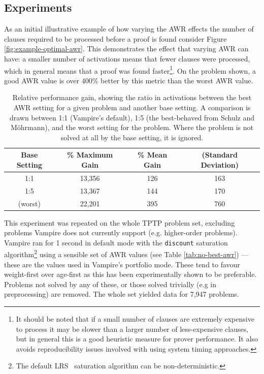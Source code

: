 \documentclass{llncs}
\newcommand{\sandm}{Schulz and M{\"{o}}hrmann}
\begin{document}
\subsection{Experiments}
As an initial illustrative example of how varying the AWR effects the number of clauses required to be processed before a proof is found consider Figure \ref{fig:example-optimal-awr}. This demonstrates the effect that varying AWR can have: a smaller number of activations means that fewer clauses were processed, which in general means that a proof was found faster\footnote{
It should be noted that if a small number of clauses are extremely expensive to process it may be slower than a larger number of less-expensive clauses, but in general this is a good heuristic measure for prover performance.
It also avoids reproducibility issues involved with using system timing approaches.
}.
On the problem shown, a good AWR value is over 400\% better by this metric than the worst AWR value.

\begin{table}[t]
	\caption{
Relative performance gain, showing the ratio in activations between the best AWR setting for a given problem and another base setting.
A comparison is drawn between 1:1 (Vampire's default), 1:5 (the best-behaved from \sandm), and the worst setting for the problem.
Where the problem is not solved at all by the base setting, it is ignored.
}
	\centering
	\begin{tabular}{c | c | c c}
		Base Setting & \% Maximum Gain & \% Mean Gain & (Standard Deviation)\\
		\hline
		1:1 & 13,356 & 126 & 163 \\
		1:5 & 13,367 & 144 & 170 \\
		(worst) & 22,201 & 395 & 760
	\end{tabular}
	\label{tab:awr-improvement}
\end{table}

This experiment was repeated on the whole TPTP problem set, excluding problems Vampire does not currently support (e.g. higher-order problems).
Vampire ran for 1 second in default mode with the \texttt{discount} saturation algorithm\footnote{The default LRS~\cite{LRS} saturation algorithm can be non-deterministic.} using a sensible set of AWR values (see Table \ref{tab:no-best-awr}) --- these are the values used in Vampire's portfolio mode.
These tend to favour weight-first over age-first as this has been experimentally shown to be preferable.
Problems not solved by any of these, or those solved trivially (e.g in preprocessing) are removed.
The whole set yielded data for 7,947 problems. 
\end{document}
